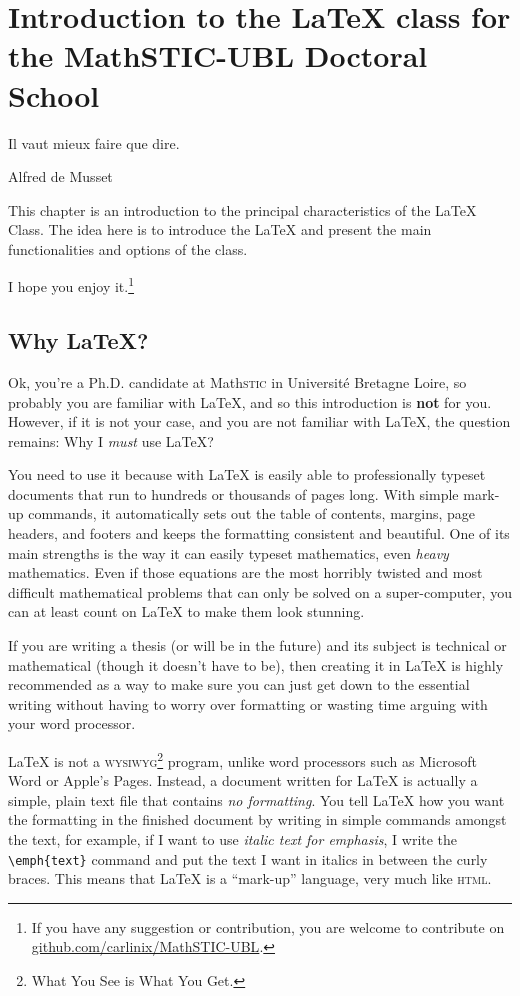 \chapter{Introduction to the \LaTeX{} class for the MathSTIC-UBL Doctoral School}\label{chap:intro}

\epigraph{Il vaut mieux faire que dire.}{Alfred de Musset}
\minitoc%

This chapter is an introduction to the principal characteristics of the \ublmstic{} \LaTeX{} Class. 
The idea here is to introduce the \LaTeX{} and present the main functionalities and options of the class.


I hope you enjoy it.\footnote{If you have any suggestion or contribution, you are welcome to contribute on \url{github.com/carlinix/MathSTIC-UBL}.}

\section{Why \LaTeX?}\label{sec:why}
Ok, you're a Ph.D. candidate at Math\textsc{stic} in Université Bretagne Loire, so probably you are familiar with \LaTeX{}, and so this introduction is \textbf{not} for you.
However,  if it is not your case, and you are not familiar with \LaTeX{}, the question remains: Why I \emph{must} use \LaTeX?

You need to use it because with \LaTeX{} is easily able to professionally typeset documents that run to hundreds or thousands of pages long. 
With simple mark-up commands, it automatically sets out the table of contents, margins, page headers, and footers and keeps the formatting consistent and beautiful. 
One of its main strengths is the way it can easily typeset mathematics, even \emph{heavy} mathematics. 
Even if those equations are the most horribly twisted and most difficult mathematical problems that can only be solved on a super-computer, you can at least count on \LaTeX{} to make them look stunning.

If you are writing a thesis (or will be in the future) and its subject is technical or mathematical (though it doesn't have to be), then creating it in \LaTeX{} is highly recommended as a way to make sure you can just get down to the essential writing without having to worry over formatting or wasting time arguing with your word processor.

\LaTeX{} is not a \textsc{wysiwyg}\footnote{What You See is What You Get.} program, unlike word processors such as Microsoft Word or Apple's Pages. 
Instead, a document written for \LaTeX{} is actually a simple, plain text file that contains \emph{no formatting}. 
You tell \LaTeX{} how you want the formatting in the finished document by writing in simple commands amongst the text, for example, if I want to use \emph{italic text for emphasis}, I write the \verb|\emph{text}| command and put the text I want in italics in between the curly braces. 
This means that \LaTeX{} is a \enquote{mark-up} language, very much like \textsc{html}.

